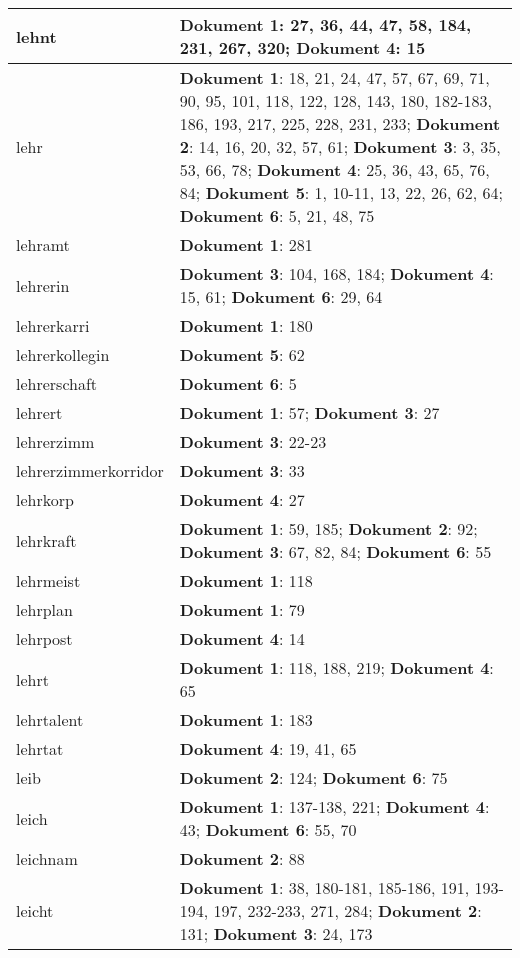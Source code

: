 \documentclass[a5paper]{article}
\begin{document}
\begin{longtable}[l]{|l|p{3in}|}
\hline
lehnt & \textbf{Dokument 1}: 27, 36, 44, 47, 58, 184, 231, 267, 320; \textbf{Dokument 4}: 15 \\
\hline
lehr & \textbf{Dokument 1}: 18, 21, 24, 47, 57, 67, 69, 71, 90, 95, 101, 118, 122, 128, 143, 180, 182-183, 186, 193, 217, 225, 228, 231, 233; \textbf{Dokument 2}: 14, 16, 20, 32, 57, 61; \textbf{Dokument 3}: 3, 35, 53, 66, 78; \textbf{Dokument 4}: 25, 36, 43, 65, 76, 84; \textbf{Dokument 5}: 1, 10-11, 13, 22, 26, 62, 64; \textbf{Dokument 6}: 5, 21, 48, 75 \\
\hline
lehramt & \textbf{Dokument 1}: 281 \\
\hline
lehrerin & \textbf{Dokument 3}: 104, 168, 184; \textbf{Dokument 4}: 15, 61; \textbf{Dokument 6}: 29, 64 \\
\hline
lehrerkarri & \textbf{Dokument 1}: 180 \\
\hline
lehrerkollegin & \textbf{Dokument 5}: 62 \\
\hline
lehrerschaft & \textbf{Dokument 6}: 5 \\
\hline
lehrert & \textbf{Dokument 1}: 57; \textbf{Dokument 3}: 27 \\
\hline
lehrerzimm & \textbf{Dokument 3}: 22-23 \\
\hline
lehrerzimmerkorridor & \textbf{Dokument 3}: 33 \\
\hline
lehrkorp & \textbf{Dokument 4}: 27 \\
\hline
lehrkraft & \textbf{Dokument 1}: 59, 185; \textbf{Dokument 2}: 92; \textbf{Dokument 3}: 67, 82, 84; \textbf{Dokument 6}: 55 \\
\hline
lehrmeist & \textbf{Dokument 1}: 118 \\
\hline
lehrplan & \textbf{Dokument 1}: 79 \\
\hline
lehrpost & \textbf{Dokument 4}: 14 \\
\hline
lehrt & \textbf{Dokument 1}: 118, 188, 219; \textbf{Dokument 4}: 65 \\
\hline
lehrtalent & \textbf{Dokument 1}: 183 \\
\hline
lehrtat & \textbf{Dokument 4}: 19, 41, 65 \\
\hline
leib & \textbf{Dokument 2}: 124; \textbf{Dokument 6}: 75 \\
\hline
leich & \textbf{Dokument 1}: 137-138, 221; \textbf{Dokument 4}: 43; \textbf{Dokument 6}: 55, 70 \\
\hline
leichnam & \textbf{Dokument 2}: 88 \\
\hline
leicht & \textbf{Dokument 1}: 38, 180-181, 185-186, 191, 193-194, 197, 232-233, 271, 284; \textbf{Dokument 2}: 131; \textbf{Dokument 3}: 24, 173 \\

\end{longtable}
\end{document}
